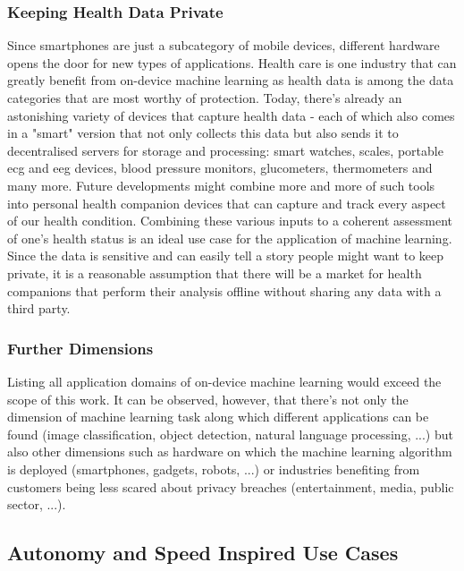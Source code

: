 \documentclass[
			   fontsize=11pt,
               paper=a4,
               bibliography=totoc,
               idxtotoc,
               headsepline,
               footsepline,
               footinclude=false,
               BCOR=12mm,
               DIV=13,
               openany,   %
               ]
               {scrbook}
\begin{document}
\subsubsection{Keeping Health Data Private}
Since smartphones are just a subcategory of mobile devices, different hardware opens the door for new types of applications. Health care is one industry that can greatly benefit from on-device machine learning as health data is among the data categories that are most worthy of protection. Today, there's already an astonishing variety of devices that capture health data - each of which also comes in a "smart" version that not only collects this data but also sends it to decentralised servers for storage and processing: smart watches, scales, portable \gls{ecg} and \gls{eeg} devices, blood pressure monitors, glucometers, thermometers and many more. Future developments might combine more and more of such tools into personal health companion devices that can capture and track every aspect of our health condition. Combining these various inputs to a coherent assessment of one's health status is an ideal use case for the application of machine learning. Since the data is sensitive and can easily tell a story people might want to keep private, it is a reasonable assumption that there will be a market for health companions that perform their analysis offline without sharing any data with a third party.

\subsubsection{Further Dimensions}
Listing all application domains of on-device machine learning would exceed the scope of this work. It can be observed, however, that there's not only the dimension of machine learning task along which different applications can be found (image classification, object detection, natural language processing, ...) but also other dimensions such as hardware on which the machine learning algorithm is deployed (smartphones, gadgets, robots, ...) or industries benefiting from customers being less scared about privacy breaches (entertainment, media, public sector, ...). \\


\subsection{Autonomy and Speed Inspired Use Cases}
\end{document}
